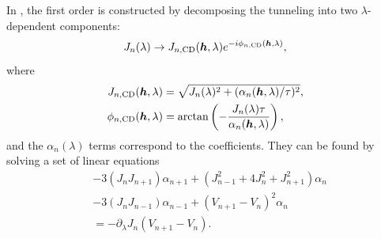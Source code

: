 In \cite{meier_counterdiabatic_2020}, the first order  is constructed by decomposing the tunneling into two $\lambda$-dependent components:
\begin{equation}\label{eq:tunneling}
    J_n(\lambda) \rightarrow J_{n, \mathrm{CD}}(\boldsymbol{h}, \lambda) e^{-i\phi_{n, \mathrm{CD}}(\boldsymbol{h}, \lambda)},
\end{equation}
where
\begin{equation}\label{eq:J_cd}
    \begin{aligned}
    J_{n, \mathrm{CD}}(\boldsymbol{h}, \lambda) &= \sqrt{J_n(\lambda)^2 + (\alpha_n(\boldsymbol{h}, \lambda)/\tau)^2}, \\
    \phi_{n, \mathrm{CD}}(\boldsymbol{h}, \lambda)  &= \arctan\left(-\frac{J_n(\lambda)\tau}{\alpha_n(\boldsymbol{h}, \lambda)}\right),
    \end{aligned}
\end{equation}
and the $\alpha_n(\lambda)$ terms correspond to the  coefficients. They can be found by solving a set of linear equations
\begin{equation}
    \begin{aligned}
        &-3(J_n J_{n+1})\alpha_{n+1} + (J_{n-1}^2 + 4J^2_n + J_{n+1}^2)\alpha_n \\ &- 3(J_n J_{n-1})\alpha_{n-1} + (V_{n+1} - V_n)^2 \alpha_n \\ &= -\partial_{\lambda}J_n (V_{n+1} - V_{n}).
    \end{aligned}
\end{equation}

